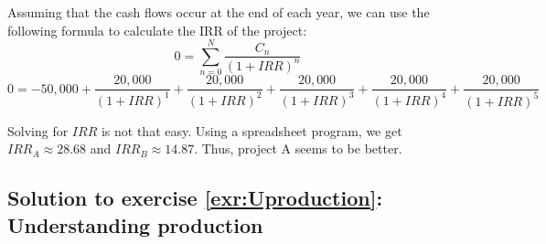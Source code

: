 \documentclass[
  12pt,
  oneside]{book}
\theoremstyle{definition}
\theoremstyle{definition}
\theoremstyle{definition}
\theoremstyle{definition}
\theoremstyle{remark}
\begin{document}
Assuming that the cash flows occur at the end of each year, we can use the following formula to calculate the IRR of the project:
\[ 0 = \sum_{n=0}^{N} \frac{C_n}{(1+IRR)^n}  \]
\[
0 = -50,000 + 
\frac{20,000}{(1 + IRR)^1} 
+ \frac{20,000 }{ (1 + IRR)^2 }
+ \frac{20,000 }{ (1 + IRR)^3 }
+ \frac{20,000 }{ (1 + IRR)^4 }
+ \frac{20,000 }{ (1 + IRR)^5 }
\]

Solving for \(IRR\) is not that easy. Using a spreadsheet program, we get \(IRR_A\approx 28.68%
\) and \(IRR_B\approx 14.87%
\). Thus, project A seems to be better.

\hypertarget{sol:Uproduction}{%
\subsection*{Solution to exercise \ref{exr:Uproduction}: Understanding production}\label{sol:Uproduction}}
\end{document}
